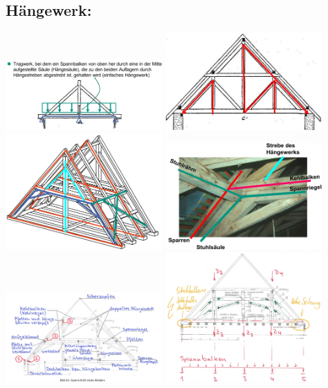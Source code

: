 \documentclass[fleqn,twoside]{article}
\begin{document}
    \subsection{Hängewerk:}
            \includegraphics[width=0.45\textwidth]{Grafiken/Daecher/Haengewerk.jpg}
            \includegraphics[width=0.45\textwidth]{Grafiken/Daecher/Mehrfaches Haengewerk.jpg}\\
            \includegraphics[width=0.45\textwidth]{Grafiken/Daecher/Haengewerk auf liegenden Stuhl.jpg}
            \includegraphics[width=0.45\textwidth]{Grafiken/Daecher/Knotenpunkt Haengewerk.jpg}\\
            \includegraphics[width=0.45\textwidth]{Grafiken/Daecher/Dach kompliziert.png}
            \includegraphics[width=0.45\textwidth]{Grafiken/Daecher/Fehlerhafter Stichbalken.jpg}
\end{document}
